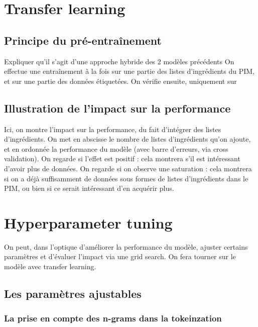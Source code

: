     \chapter{Transfer learning}
        
        \section{Principe du pré-entraînement}
        
        Expliquer qu'il s'agit d'une approche hybride des 2 modèles précédents
        On effectue une entraînement à la fois sur une partie des listes d'ingrédients du PIM, et sur une partie des données étiquetées.
        On vérifie ensuite, uniquement sur 

        \section{Illustration de l'impact sur la performance}

        Ici, on montre l'impact sur la performance, du fait d'intégrer des listes d'ingrédients.
        On met en abscisse le nombre de listes d'ingrédients qu'on ajoute, et en ordonnée la performance du modèle (avec barre d'erreurs, via cross validation).
        On regarde si l'effet est positif : cela montrera s'il est intéressant d'avoir plus de données.
        On regarde si on observe une saturation : cela montrera si on a déjà suffisamment de données sous formes de listes d'ingrédients dans le PIM, ou bien si ce serait intéressant d'en acquérir plus.

    \chapter{Hyperparameter tuning}
            
    On peut, dans l'optique d'améliorer la performance du modèle, ajuster certains paramètres et d'évaluer l'impact via une grid search.
    On fera tourner sur le modèle avec transfer learning.

        \section{Les paramètres ajustables}

            \subsection{La prise en compte des \og n-grams \fg dans la tokeinzation}

